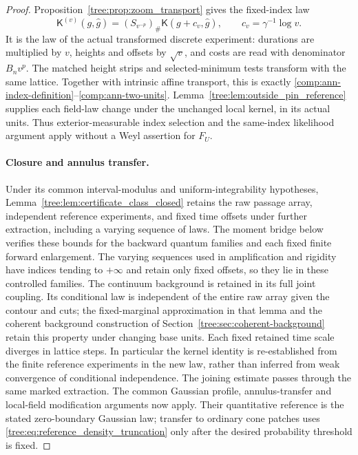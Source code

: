 \begin{proof}
Proposition~\ref{tree:prop:zoom_transport} gives the fixed-index law
\[
 \mathsf K^{(v)}(g,\widehat g)
     =(S_{v^{-p}})_\#\mathsf K(g+c_v,\widehat g),
 \qquad c_v=\gamma^{-1}\log v.
\]
It is the law of the actual transformed discrete experiment:
durations are multiplied by $v$, heights and offsets by $\sqrt v$,
and costs are read with denominator $B_nv^p$. The matched height
strips and selected-minimum tests transform with the same lattice.
Together with intrinsic affine transport, this is exactly
\eqref{comp:ann-index-definition}--\eqref{comp:ann-two-units}.
Lemma~\ref{tree:lem:outside_pin_reference} supplies each field-law
change under the unchanged local kernel, in its actual units.
Thus exterior-measurable index selection and the same-index
likelihood argument apply without a Weyl assertion for $F_U$.

\paragraph{Closure and annulus transfer.}
Under its common interval-modulus and uniform-integrability hypotheses,
Lemma~\ref{tree:lem:certificate_class_closed} retains the raw passage
array, independent reference experiments, and fixed time offsets
under further extraction, including a varying sequence of laws.
The moment bridge below verifies these bounds for the backward quantum
families and each fixed finite forward enlargement. The varying
sequences used in amplification and rigidity have indices tending to
$+\infty$ and retain only fixed offsets, so they lie in these controlled
families.
The continuum background is retained in its full joint coupling.
Its conditional law is independent of the entire raw array given
the contour and cuts; the fixed-marginal approximation in that lemma
and the coherent background construction of
Section~\ref{tree:sec:coherent-background} retain this property under changing
base units. Each fixed retained time scale diverges in lattice steps.
In particular the kernel identity is re-established from the
finite reference experiments in the new law, rather than inferred
from weak convergence of conditional independence.
The joining estimate passes through the same marked extraction.
The common Gaussian profile, annulus-transfer and local-field
modification arguments now apply. Their quantitative reference is
the stated zero-boundary Gaussian law; transfer to ordinary cone
patches uses \eqref{tree:eq:reference_density_truncation} only after
the desired probability threshold is fixed.
\end{proof}

